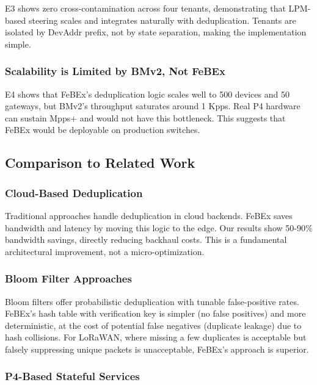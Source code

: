 E3 shows zero cross-contamination across four tenants, demonstrating that LPM-based steering scales and integrates naturally with deduplication. Tenants are isolated by DevAddr prefix, not by state separation, making the implementation simple.

\subsubsection{Scalability is Limited by BMv2, Not FeBEx}

E4 shows that FeBEx's deduplication logic scales well to 500 devices and 50 gateways, but BMv2's throughput saturates around 1 Kpps. Real P4 hardware can sustain Mpps+ and would not have this bottleneck. This suggests that FeBEx would be deployable on production switches.

\subsection{Comparison to Related Work}

\subsubsection{Cloud-Based Deduplication}

Traditional approaches handle deduplication in cloud backends. FeBEx saves bandwidth and latency by moving this logic to the edge. Our results show 50-90\% bandwidth savings, directly reducing backhaul costs. This is a fundamental architectural improvement, not a micro-optimization.

\subsubsection{Bloom Filter Approaches}

Bloom filters offer probabilistic deduplication with tunable false-positive rates. FeBEx's hash table with verification key is simpler (no false positives) and more deterministic, at the cost of potential false negatives (duplicate leakage) due to hash collisions. For LoRaWAN, where missing a few duplicates is acceptable but falsely suppressing unique packets is unacceptable, FeBEx's approach is superior.

\subsubsection{P4-Based Stateful Services}

